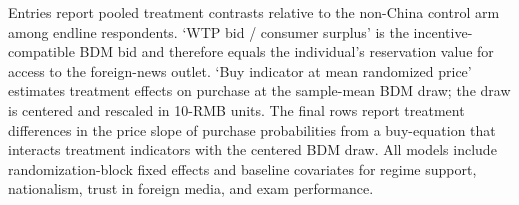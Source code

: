 \begin{table}[H]
\begin{threeparttable}
\begin{tablenotes}[flushleft]
\item Entries report pooled treatment contrasts relative to the non-China control arm among endline respondents. `WTP bid / consumer surplus' is the incentive-compatible BDM bid and therefore equals the individual's reservation value for access to the foreign-news outlet. `Buy indicator at mean randomized price' estimates treatment effects on purchase at the sample-mean BDM draw; the draw is centered and rescaled in 10-RMB units. The final rows report treatment differences in the price slope of purchase probabilities from a buy-equation that interacts treatment indicators with the centered BDM draw. All models include randomization-block fixed effects and baseline covariates for regime support, nationalism, trust in foreign media, and exam performance.
\end{tablenotes}
\end{threeparttable}
\end{table}
